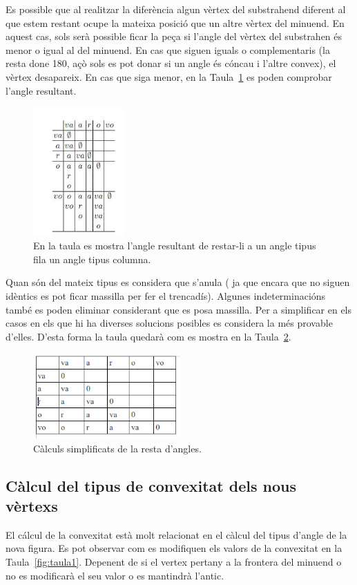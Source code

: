 \documentclass{article}
\begin{document}
Es possible que al realitzar la diferència algun vèrtex del substrahend diferent al que estem restant ocupe la mateixa posició que un altre vèrtex del minuend.
En aquest cas, sols serà possible ficar la peça si l’angle del vèrtex del substrahen és menor o igual al del minuend.
En cas que siguen iguals o complementaris (la resta done 180, açò sols es pot donar si un angle és cóncau i l’altre convex), el vèrtex desapareix.
En cas que siga menor, en la Taula~\ref{fig:taula2} es poden comprobar l’angle resultant.

\begin{figure}[h]
\centering
\includegraphics[width=100pt]{images/taula2.jpeg}
\caption {En la taula es mostra l’angle resultant de restar-li a un angle tipus fila un angle tipus columna.}
\label {fig:taula2}
\end{figure}


Quan són del mateix tipus es considera que s’anula ( ja que encara que no siguen idèntics es pot ficar massilla per fer el trencadís).
Algunes indeterminacións també es poden eliminar considerant que es posa massilla.
Per a simplificar en els casos en els que hi ha diverses solucions posibles es considera la més provable d'elles.
D'esta forma la taula quedarà com es mostra en la Taula~\ref{fig:taula3}.

\begin{figure}[h]
\centering
\includegraphics[width=160pt]{images/taula3.png}
\caption {Càlculs simplificats de la resta d'angles.}
\label {fig:taula3}
\end{figure}


\subsection{Càlcul del tipus de convexitat dels nous vèrtexs}
El cálcul de la convexitat està molt relacionat en el càlcul del tipus d'angle de la nova figura.
Es pot observar com es modifiquen els valors de la convexitat en la Taula~\ref{fig:taula1}.
Depenent de si el vertex pertany a la frontera del minuend o no es modificarà el seu valor o es mantindrà l'antic.
\\
\\
\end{document}
